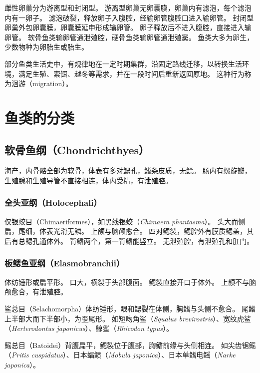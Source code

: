 \documentclass[11pt]{article}
\begin{document}
\newline

雌性卵巢分为游离型和封闭型。
游离型卵巢无卵囊膜，卵巢内有滤泡，每个滤泡内有一卵子。
滤泡破裂，释放卵子入腹腔，经输卵管腹腔口进入输卵管。
封闭型卵巢外包卵囊膜，卵囊膜延申形成输卵管。
卵子释放后不进入腹腔，直接进入输卵管。
软骨鱼类输卵管通泄殖腔，硬骨鱼类输卵管通泄殖窦。
鱼类大多为卵生，少数物种为卵胎生或胎生。

\newline

部分鱼类生活史中，有规律地在一定时期集群，沿固定路线迁移，以转换生活环境，满足生殖、索饵、越冬等需求，并在一段时间后重新返回原地。
这种行为称为洄游（migration）。
  
\section{鱼类的分类}
\subsection{软骨鱼纲（Chondrichthyes）}
海产，内骨骼全部为软骨，体表有多对鳃孔，鳍条皮质，无鳔。
肠内有螺旋瓣，生殖腺和生殖导管不直接相连，体内受精，有泄殖腔。

\subsubsection{全头亚纲（Holocephali）}
仅银蛟目（Chimaeriformes），如黑线银蛟（\textit{Chimaera phantasma}）。
头大而侧扁，尾细，体表光滑无鳞。
上颌与脑颅愈合。
四对鳃裂，鳃腔外有膜质鳃盖，其后有总鳃孔通体外。
背鳍两个，第一背鳍能竖立。
无泄殖腔，有泄殖孔和肛门。

\subsubsection{板鳃鱼亚纲（Elasmobranchii）}
体纺锤形或扁平形。
口大，横裂于头部腹面。
鳃裂直接开口于体外。
上颌不与脑颅愈合，有泄殖腔。

\newline

鲨总目（Selachomorpha）体纺锤形，眼和鳃裂在体侧，胸鳍与头侧不愈合。
尾鳍上半部大而下半部小，为歪尾形。
如短吻角鲨（\textit{Squalus brevirostris}）、宽纹虎鲨（\textit{Herterodontus japonicus}）、鲸鲨（\textit{Rhicodon typus}）。

\newline

鳐总目（Batoidei）背腹扁平，鳃裂位于腹部，胸鳍前缘与头侧相连。
如尖齿锯鳐（\textit{Pritis cuspidatus}）、日本蝠鲼（\textit{Mobula japonica}）、日本单鳍电鳐（\textit{Narke japonica}）。
\end{document}
